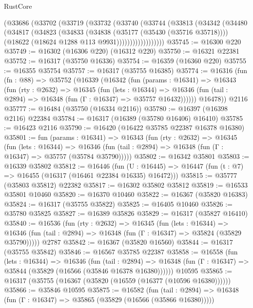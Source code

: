 \begin{lexlean}{RustCore}
\begin{coremodule}
            (@33686
              (@33702
                (@33719
                  (@33732
                    (@33740
                      (@33744
                        (@33813
                          (@34342
                            (@34480
                              (@34817
                                (@34823
                                  (@34833
                                    (@34838 (@35177 (@35430 (@35716 @35718))))
                                    (@18622 (@18624 @1288 @113 @9931))))))))))))))))))
@35745 := @16300 @220
@35749 := @16302 (@16306 @220) (@16312 @220)
@35750 := @16321 @22381
@35752 := @16317 (@35750 @16336)
@35754 := @16359 (@16360 @220)
@35755 := @16355 @35754
@35757 := @16317 (@35755 @16385)
@35774 := @16316
    (fun (fn : @88) =>
    @35752
      (@16339
        (@16342
          (fun (params : @16341) =>
          @16343
            (fun (rty : @2632) =>
            @16345
              (fun (lets : @16344) =>
              @16346 (fun (tail : @2894) => @16348 (fun (Γ : @16347) => @35757 @16432))))))
        @16478))
    @2116
@35777 := @16484 (@35750 (@16334 @2116))
@35780 := @16397 (@16398 @2116) @22384
@35784 := @16317 (@16389 (@35780 @16406) @16410)
@35785 := @16423 @2116
@35790 := @16420 (@16422 @35785 @22387 @16378 @16380)
@35801 := fun (params : @16341) =>
  @16343
    (fun (rty : @2632) =>
    @16345
      (fun (lets : @16344) =>
      @16346 (fun (tail : @2894) => @16348 (fun (Γ : @16347) => @35757 (@35784 @35790)))))
@35802 := @16342 @35801
@35803 := @16339 @35802
@35812 := @16446
    (fun (U : @16445) => @16447 (fun (t : @7) => @16455 (@16317 (@16461 @22384 @16335) @16472)))
@35815 := @35777 (@35803 @35812) @22382
@35817 := @16302 @35802 @35812
@35819 := @16533 @35801 @10460
@35820 := @16370 @10460
@35822 := @16367 (@35820 @16383)
@35824 := @16317 (@35755 @35822)
@35825 := @16405 @10460
@35826 := @35780 @35825
@35827 := @16389 @35826
@35829 := @16317 (@35827 @16410)
@35840 := @16536
    (fun (rty : @2632) =>
    @16345
      (fun (lets : @16344) =>
      @16346 (fun (tail : @2894) => @16348 (fun (Γ : @16347) => @35824 (@35829 @35790)))))
    @2787
@35842 := @16367 (@35820 @16560)
@35844 := @16317 (@35755 @35842)
@35846 := @16567 @35785 @22387
@35858 := @16558
    (fun (lets : @16344) =>
    @16346
      (fun (tail : @2894) =>
      @16348 (fun (Γ : @16347) => @35844 (@35829 (@16566 (@35846 @16378 @16380))))))
    @10595
@35865 := @16317 (@35755 (@16367 (@35820 (@16559 (@16377 (@10596 @16380))))))
@35866 := @35846 @10595
@35875 := @16582
    (fun (tail : @2894) => @16348 (fun (Γ : @16347) => @35865 (@35829 (@16566 (@35866 @16380)))))

\end{coremodule}
\end{lexlean}
